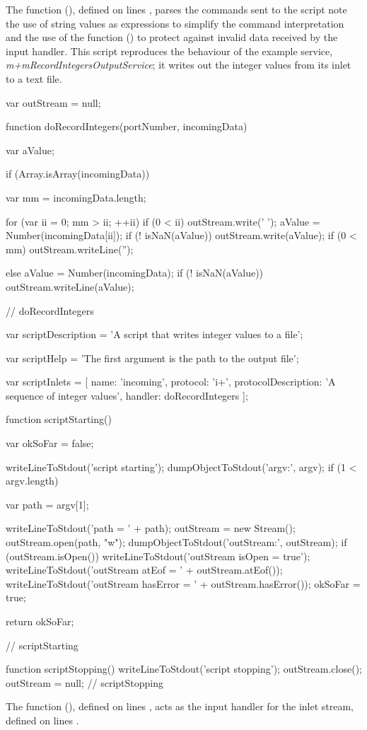 The function (), defined on lines \longDash{}, parses
the commands sent to the script \longDash{} note the use of string values as 
expressions to simplify the command interpretation and the use of the function
() to protect against invalid data received by the input handler.
\secondaryEnd
\condPage
{}
This script reproduces the behaviour of the example service,
\emph{m+mRecordIntegersOutputService}; it writes out the integer values from its inlet to
a text file.
\codeBegin
\begin{listing}[5]{1}
var outStream = null;

function doRecordIntegers(portNumber, incomingData)
{
    var aValue;
    
    if (Array.isArray(incomingData))
    {
        var mm = incomingData.length;
        
        for (var ii = 0; mm > ii; ++ii)
        {
            if (0 < ii)
            {
                outStream.write(' ');
            }
            aValue = Number(incomingData[ii]);
            if (! isNaN(aValue))
            {
                outStream.write(aValue);
            }
        }
        if (0 < mm)
        {
            outStream.writeLine('');
        }
    }
    else
    {
        aValue = Number(incomingData);
        if (! isNaN(aValue))
        {
            outStream.writeLine(aValue);
        }
    }
} // doRecordIntegers

var scriptDescription = 'A script that writes integer values to a file';

var scriptHelp = 'The first argument is the path to the output file';

var scriptInlets = [ { name: 'incoming', protocol: 'i+',
                        protocolDescription: 'A sequence of integer values',
                        handler: doRecordIntegers } ];

function scriptStarting()
{
    var okSoFar = false;
    
    writeLineToStdout('script starting');
    dumpObjectToStdout('argv:', argv);
    if (1 < argv.length)
    {
        var path = argv[1];
        
        writeLineToStdout('path = ' + path);
        outStream = new Stream();
        outStream.open(path, "w");
        dumpObjectToStdout('outStream:', outStream);
        if (outStream.isOpen())
        {
            writeLineToStdout('outStream isOpen = true');
            writeLineToStdout('outStream atEof = ' + outStream.atEof());
            writeLineToStdout('outStream hasError = ' + outStream.hasError());
        }
        okSoFar = true;
    }
    return okSoFar;
} // scriptStarting

function scriptStopping()
{
    writeLineToStdout('script stopping');
    outStream.close();
    outStream = null;
} // scriptStopping
\end{listing}
\codeEnd{}
The function (), defined on lines \longDash{},
acts as the input handler for the inlet stream, defined on lines
\longDash{}.\\

